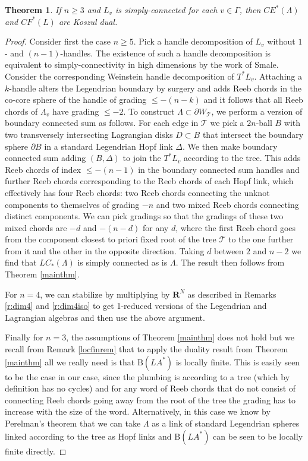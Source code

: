 \documentclass{gtpart}
\newtheorem{thm}{Theorem}
\renewcommand{\Bar}{\mathrm{B}}
\renewcommand{\R}{\mathbf{R}}
\begin{document}
\begin{thm} \label{plumbs}  
	If $n \geq 3$ and $L_v$ is simply-connected for each $v\in\Gamma$, then $CE^*(\Lambda)$ and $CF^*(L)$ are Koszul dual. 
\end{thm}
\begin{proof} 
	Consider first the case $n \geq 5$. Pick a handle decomposition of $L_{v}$ without
    $1$- and $(n-1)$-handles. The existence of such a handle decomposition is equivalent to
    simply-connectivity in high dimensions by the work of Smale. Consider the corresponding
    Weinstein handle decomposition of $T^{\ast}L_{v}$.  Attaching a $k$-handle alters the Legendrian
    boundary by surgery and adds Reeb chords in the co-core sphere of the handle of grading $\le
    -(n-k)$ and it follows that all Reeb chords of $\Lambda_{v}$ have grading $\le -2$. To construct
    $\Lambda\subset \partial W_{\mathcal{T}}$, we perform a version of boundary connected sum as
    follows. For each edge in $\mathcal{T}$ we pick a $2n$-ball $B$ with two transversely
    intersecting Lagrangian disks $D\subset B$ that intersect the boundary sphere $\partial B$ in a
    standard Legendrian Hopf link $\Delta$. We then make boundary connected sum adding $(B,\Delta)$
    to join the $T^{\ast}L_{v}$ according to the tree. This adds Reeb chords of index $\le -(n-1)$
    in the boundary connected sum handles and further Reeb chords corresponding to the Reeb
    chords of each Hopf link, which effectively has four Reeb chords: two Reeb chords connecting the unknot components to themselves of grading $-n$ and two mixed Reeb chords connecting distinct components. We can pick gradings so that the gradings of these two mixed chords are $-d$ and
    $-(n-d)$ for any $d$, where the first Reeb chord goes from the component closest to priori fixed
    root of the tree $\mathcal{T}$ to the one further from it and the other in the opposite
    direction. Taking $d$ between $2$ and $n-2$ we find that $LC_*(\Lambda)$ is simply connected as is $\Lambda$. The result then follows from Theorem \ref{mainthm}.
    
For $n=4$, we can stabilize by multiplying by $\R^{N}$ as described in Remarks \ref{r:dim4} and \ref{r:dim4iso} to get 1-reduced versions of the Legendrian and Lagrangian algebras and then use the above argument.
         
Finally for $n=3$, the assumptions of Theorem \ref{mainthm} does not hold but we recall from
Remark \ref{locfinrem} that to apply the duality result from Theorem \ref{mainthm} all we really need is that $\Bar (LA^*)$ is locally finite. This is easily seen to be the case in our case, since the
    plumbing is according to a tree (which by definition has no cycles) and for any word of Reeb chords
    that do not consist of connecting Reeb chords going away from the root of the tree the
    grading has to increase with the size of the word. Alternatively, in this case we know by
    Perelman's theorem that we can take $\Lambda$ as a link of standard Legendrian spheres linked
    according to the tree as Hopf links and $\Bar (LA^*)$ can be seen to be locally finite directly. \end{proof}
\end{document}

